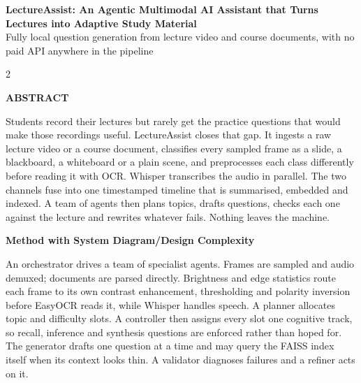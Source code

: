 \documentclass[10pt,a4paper]{article}
\newcommand{\synsection}[1]{%
  \needspace{3\baselineskip}%
  \vspace{0.55em}\noindent\textbf{#1}\par\vspace{0.25em}}
\begin{document}
\begin{center}
  {\bfseries LectureAssist: An Agentic Multimodal AI Assistant that Turns
   Lectures into Adaptive Study Material}\\[0.3em]
  Fully local question generation from lecture video and course documents,
  with no paid API anywhere in the pipeline
\end{center}

\vspace{0.6em}

\begin{multicols}{2}

\synsection{ABSTRACT}

Students record their lectures but rarely get the practice questions that
would make those recordings useful. LectureAssist closes that gap. It
ingests a raw lecture video or a course document, classifies every sampled
frame as a slide, a blackboard, a whiteboard or a plain scene, and
preprocesses each class differently before reading it with OCR. Whisper
transcribes the audio in parallel. The two channels fuse into one
timestamped timeline that is summarised, embedded and indexed. A team of
agents then plans topics, drafts questions, checks each one against the
lecture and rewrites whatever fails. Nothing leaves the machine.

\synsection{Method with System Diagram/Design Complexity}

An orchestrator drives a team of specialist agents. Frames are sampled and
audio demuxed; documents are parsed directly. Brightness and edge
statistics route each frame to its own contrast enhancement, thresholding
and polarity inversion before EasyOCR reads it, while Whisper handles
speech. A planner allocates topic and difficulty slots. A controller then
assigns every slot one cognitive track, so recall, inference and synthesis
questions are enforced rather than hoped for. The generator drafts one
question at a time and may query the FAISS index itself when its context
looks thin. A validator diagnoses failures and a refiner acts on it.

\end{multicols}
\end{document}

